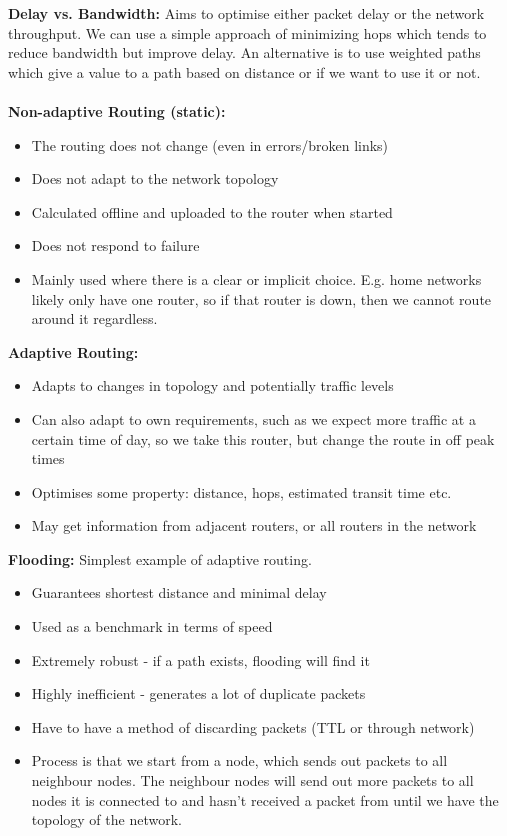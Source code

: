 \documentclass[a4paper,10pt]{article}
\begin{document}
\textcolor{Melon}{\textbf{Delay vs. Bandwidth:}} Aims to optimise either packet delay or the network throughput. We can use a simple approach of minimizing hops which tends to reduce bandwidth but improve delay. An alternative is to use weighted paths which give a value to a path based on distance or if we want to use it or not. \\\\
\textcolor{Melon}{\textbf{Non-adaptive Routing (static):}} 
\begin{itemize}
	\item The routing does not change (even in errors/broken links)
	\item Does not adapt to the network topology 
	\item Calculated offline and uploaded to the router when started
	\item Does not respond to failure 
	\item Mainly used where there is a clear or implicit choice. E.g. home networks likely only have one router, so if that router is down, then we cannot route around it regardless.  
\end{itemize}
\textcolor{Melon}{\textbf{Adaptive Routing:}} 
\begin{itemize}
	\item Adapts to changes in topology and potentially traffic levels 
	\item Can also adapt to own requirements, such as we expect more traffic at a certain time of day, so we take this router, but change the route in off peak times 
	\item Optimises some property: distance, hops, estimated transit time etc.
	\item May get information from adjacent routers, or all routers in the network
\end{itemize}
\newpage
\textcolor{Melon}{\textbf{Flooding:}} Simplest example of adaptive routing. 
\begin{itemize}
	\item Guarantees shortest distance and minimal delay 
	\item Used as a benchmark in terms of speed 
	\item Extremely robust - if a path exists, flooding will find it 
	\item Highly inefficient - generates a lot of duplicate packets 
	\item Have to have a method of discarding packets (TTL or through network)
	\item Process is that we start from a node, which sends out packets to all neighbour nodes. The neighbour nodes will send out more packets to all nodes it is connected to and hasn't received a packet from until we have the topology of the network. 
\end{itemize}
\end{document}
